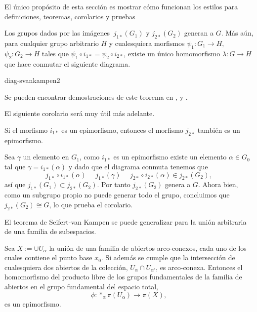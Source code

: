 \documentclass[11pt, twoside]{book}
\begin{document}
El único propósito de esta sección es mostrar cómo funcionan los estilos para
definiciones, teoremas, corolarios y pruebas

\begin{teorema} %
  Los grupos dados por las imágenes \(\ j_{1*}(G_1)\) y 
  \(j_{2*}(G_2)\) generan a \(G\). Más aún, para cualquier grupo arbitrario  
  \(H\) y cualesquiera morfismos \(\psi_1:G_1 \rightarrow H\), 
  \(\psi_2:G_2 \rightarrow H\) tales que \(\psi_1 \circ i_{1*} = \psi_2 \circ
  i_{2*}\), existe un único homomorfismo \(\lambda: G \rightarrow H\) 
  que hace conmutar el siguiente diagrama.

  \begin{center}
    {diag-svankampen2}
  \end{center}

\end{teorema}

Se pueden encontrar demostraciones de este teorema en \cite{MR445489}, 
\cite{MR666554} y \cite{MR1867354}.

El siguiente corolario será muy útil más adelante.

\begin{corolario}\label{cor:vankampenepi} %
  Si el morfismo \(i_{1*}\) es un epimorfismo, entonces el morfismo \(j_{2*}\)
  también es un epimorfismo.
\end{corolario}

\begin{prueba}
  Sea \(\gamma\) un elemento en \(G_1\), como \(i_{1*}\) es un epimorfismo 
  existe un elemento  \(\alpha \in G_0\) tal que \(\gamma = i_{1*}(\alpha)\) 
  y dado que el diagrama conmuta tenemos que
  \[j_{1*} \circ i_{1*}(\alpha) = j_{1*}(\gamma) = j_{2*} \circ 
  i_{2*}(\alpha) \in j_{2*}(G_2),\]
  así que \(j_{1*}(G_1) \subset j_{2*}(G_2)\). Por tanto \(j_{2*}(G_2)\) genera 
  a \(G\). Ahora bien, como un subgrupo propio no puede generar todo el grupo, 
  concluimos que \(j_{2*}(G_2) \cong G\), lo que prueba el corolario.
\end{prueba}

El teorema de Seifert-van Kampen se puede generalizar para la unión arbitraria
de una familia de subespacios.

\begin{lema}\label{lema:vankampengral}
  Sea \(X:= \cup U_{\alpha}\) la unión de una familia de abiertos arco-conexos,
  cada uno de los cuales contiene el punto base \(x_0\). Si además se cumple
  que la intersección de cualesquiera dos abiertos de la colección,
  \(U_{\alpha} \cap U_{\alpha'}\), es arco-conexa. Entonces el homomorfismo 
  del producto libre de los grupos fundamentales de la familia de abiertos en
  el grupo fundamental del espacio total,
  \[\phi : *_{\alpha} \pi(U_{\alpha}) \rightarrow \pi(X),\]
  es un epimorfismo.
\end{lema}
\end{document}
